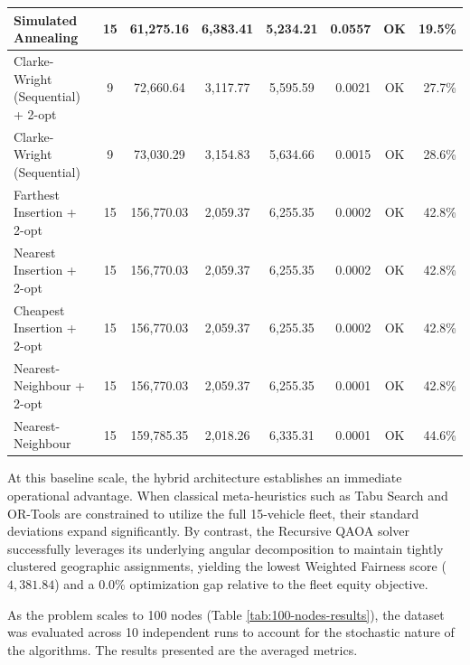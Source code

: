 \documentclass[a4paper]{report}
\begin{document}
{\begin{itemize}
\begin{itemize}
\begin{table}[htpb]
{\begin{tabular}{l c c c c r c r}
Simulated Annealing & 15 & 61,275.16 & 6,383.41 & 5,234.21 & 0.0557 & OK & 19.5\% \\
\midrule
Clarke-Wright (Sequential) + 2-opt & 9 & 72,660.64 & 3,117.77 & 5,595.59 & 0.0021 & OK & 27.7\% \\
Clarke-Wright (Sequential) & 9 & 73,030.29 & 3,154.83 & 5,634.66 & 0.0015 & OK & 28.6\% \\
\midrule
Farthest Insertion + 2-opt & 15 & 156,770.03 & 2,059.37 & 6,255.35 & 0.0002 & OK & 42.8\% \\
Nearest Insertion + 2-opt & 15 & 156,770.03 & 2,059.37 & 6,255.35 & 0.0002 & OK & 42.8\% \\
Cheapest Insertion + 2-opt & 15 & 156,770.03 & 2,059.37 & 6,255.35 & 0.0002 & OK & 42.8\% \\
Nearest-Neighbour + 2-opt & 15 & 156,770.03 & 2,059.37 & 6,255.35 & 0.0001 & OK & 42.8\% \\
Nearest-Neighbour & 15 & 159,785.35 & 2,018.26 & 6,335.31 & 0.0001 & OK & 44.6\% \\
\bottomrule
\end{tabular}
}
\end{table}

At this baseline scale, the hybrid architecture establishes an immediate operational advantage. When classical meta-heuristics such as Tabu Search and OR-Tools are constrained to utilize the full 15-vehicle fleet, their standard deviations expand significantly. By contrast, the Recursive QAOA solver successfully leverages its underlying angular decomposition to maintain tightly clustered geographic assignments, yielding the lowest Weighted Fairness score ($4,381.84$) and a $0.0\%$ optimization gap relative to the fleet equity objective.

As the problem scales to 100 nodes (Table \ref{tab:100-nodes-results}), the dataset was evaluated across 10 independent runs to account for the stochastic nature of the algorithms. The results presented are the averaged metrics.


\end{itemize}
\end{itemize}}
\end{document}

